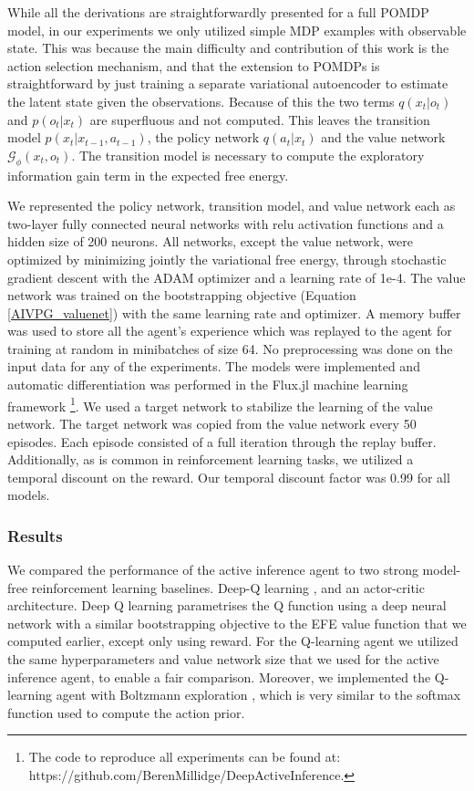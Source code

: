 While all the derivations are straightforwardly presented for a full POMDP model, in our experiments we only utilized simple MDP examples with observable state. This was because the main difficulty and contribution of this work is the action selection mechanism, and that the extension to POMDPs is straightforward by just training a separate variational autoencoder to estimate the latent state given the observations. Because of this the two terms $q(x_t | o_t)$ and $p(o_t | x_t)$ are superfluous and not computed. This leaves the transition model $p(x_t | x_{t-1}, a_{t-1})$, the policy network $q(a_t | x_t)$ and the value network $\mathcal{G}_\phi(x_t, o_t)$. The transition model is necessary to compute the exploratory information gain term in the expected free energy.

We represented the policy network, transition model, and value network each as two-layer fully connected neural networks with relu activation functions and a hidden size of 200 neurons. All networks, except the value network, were optimized by minimizing jointly the variational free energy, through stochastic gradient descent with the ADAM optimizer and a learning rate of 1e-4. The value network was trained on the bootstrapping objective (Equation \ref{AIVPG_valuenet}) with the same learning rate and optimizer. A memory buffer was used to store all the agent's experience which was replayed to the agent for training at random in minibatches of size 64. No preprocessing was done on the input data for any of the experiments. The models were implemented and automatic differentiation was performed in the Flux.jl machine learning framework \footnote{The code to reproduce all experiments can be found at: https://github.com/BerenMillidge/DeepActiveInference.}. We used a target network to stabilize the learning of the value network. The target network was copied from the value network every 50 episodes. Each episode consisted of a full iteration through the replay buffer. Additionally, as is common in reinforcement learning tasks, we utilized a temporal discount on the reward. Our temporal discount factor was 0.99 for all models.

\subsubsection{Results}
We compared the performance of the active inference agent to two strong model-free reinforcement learning baselines. Deep-Q learning \citep{mnih2013playing,mnih2015human}, and an actor-critic \citep{mnih2016asynchronous} architecture. Deep Q learning parametrises the Q function using a deep neural network with a similar bootstrapping objective to the EFE value function that we computed earlier, except only using reward. For the Q-learning agent we utilized the same hyperparameters and value network size that we used for the active inference agent, to enable a fair comparison. Moreover, we implemented the Q-learning agent with Boltzmann exploration \citep{cesa2017boltzmann}, which is very similar to the softmax function used to compute the action prior. 

